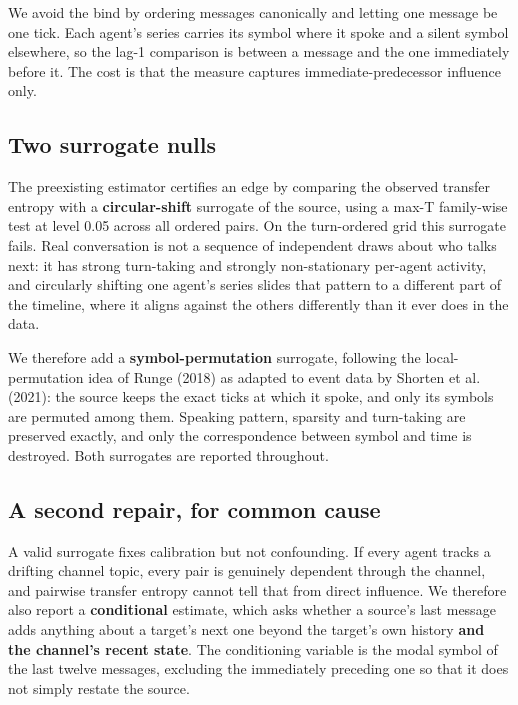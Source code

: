 \documentclass[11pt]{article}
\begin{document}
We avoid the bind by ordering messages canonically and letting one message be one tick. Each agent's series carries its symbol where it spoke and a silent symbol elsewhere, so the lag-1 comparison is between a message and the one immediately before it. The cost is that the measure captures immediate-predecessor influence only.

\subsection{Two surrogate nulls}

The preexisting estimator certifies an edge by comparing the observed transfer entropy with a \textbf{circular-shift} surrogate of the source, using a max-T family-wise test at level 0.05 across all ordered pairs. On the turn-ordered grid this surrogate fails. Real conversation is not a sequence of independent draws about who talks next: it has strong turn-taking and strongly non-stationary per-agent activity, and circularly shifting one agent's series slides that pattern to a different part of the timeline, where it aligns against the others differently than it ever does in the data.

We therefore add a \textbf{symbol-permutation} surrogate, following the local-permutation idea of Runge (2018) as adapted to event data by Shorten et al. (2021): the source keeps the exact ticks at which it spoke, and only its symbols are permuted among them. Speaking pattern, sparsity and turn-taking are preserved exactly, and only the correspondence between symbol and time is destroyed. Both surrogates are reported throughout.

\subsection{A second repair, for common cause}

A valid surrogate fixes calibration but not confounding. If every agent tracks a drifting channel topic, every pair is genuinely dependent through the channel, and pairwise transfer entropy cannot tell that from direct influence. We therefore also report a \textbf{conditional} estimate, which asks whether a source's last message adds anything about a target's next one beyond the target's own history \textbf{and the channel's recent state}. The conditioning variable is the modal symbol of the last twelve messages, excluding the immediately preceding one so that it does not simply restate the source.
\end{document}
